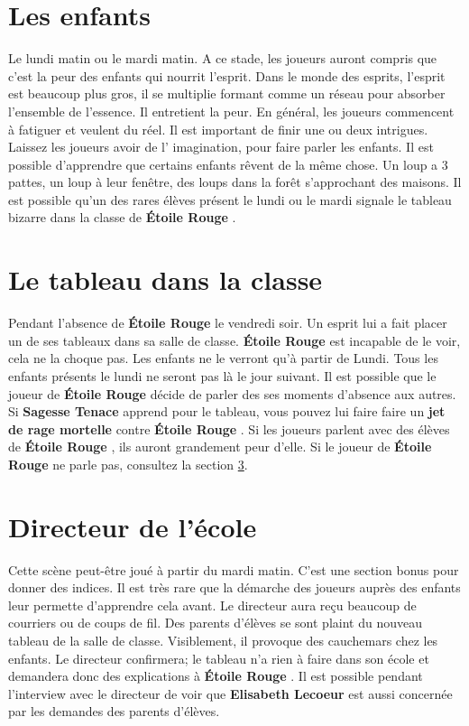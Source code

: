 \documentclass[oneside,12pt]{book}
\newcommand{\Lynn}{\textbf{Étoile Rouge} }
\newcommand{\Jessica}{\textbf{Sagesse Tenace} }
\newcommand{\Elisabeth}{\textbf{Elisabeth Lecoeur} }
\begin{document}
\begin{flushleft}
\section{Les enfants}
Le lundi matin ou le mardi matin.
A ce stade, les joueurs auront compris que c'est la peur des enfants qui nourrit l'esprit.
Dans le monde des esprits, l'esprit est beaucoup plus gros, il se multiplie formant comme un réseau pour absorber l'ensemble de l'essence. Il entretient la peur. En général, les joueurs commencent à fatiguer et veulent du réel. Il est important de finir une ou deux intrigues. Laissez les joueurs avoir de l' imagination, pour faire parler les enfants. Il est possible d'apprendre que certains enfants rêvent de la même chose. 
Un loup a 3 pattes, un loup à leur fenêtre, des loups dans la forêt s'approchant des maisons. Il est possible qu'un des rares élèves présent le lundi ou le mardi signale le tableau bizarre dans la classe de \Lynn . 

\section{Le tableau dans la classe}
Pendant l'absence de \Lynn le vendredi soir. Un esprit lui a fait placer un de ses tableaux dans sa salle de classe. \Lynn est incapable de le voir, cela ne la choque pas. Les enfants ne le verront qu'à partir de Lundi. Tous les enfants présents le lundi ne seront pas là le jour suivant. 
Il est possible que le joueur de \Lynn décide de parler des ses moments d'absence aux autres. 
Si \Jessica apprend pour le tableau, vous pouvez lui faire faire un \textbf{jet de rage mortelle} contre \Lynn . Si les joueurs parlent avec des élèves de \Lynn, ils auront grandement peur d'elle.
Si le joueur de \Lynn ne parle pas, consultez la section \ref{directeur}.

\section{Directeur de l'école}
\label{directeur}
Cette scène peut-être joué à partir du mardi matin. C'est une section bonus pour donner des indices. Il est très rare que la démarche des joueurs auprès des enfants leur permette d'apprendre cela avant. 
Le directeur aura reçu beaucoup de courriers ou de coups de fil. Des parents d'élèves se sont plaint du nouveau tableau de la salle de classe. Visiblement, il provoque des cauchemars chez les enfants. Le directeur confirmera; le tableau n'a rien à faire dans son école et demandera donc des explications à \Lynn. Il est possible pendant l'interview avec le directeur de voir que \Elisabeth est aussi concernée par les demandes des parents d’élèves.



\end{flushleft}
\end{document}
